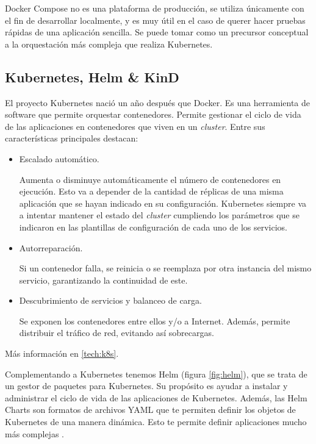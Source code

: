 Docker Compose no es una plataforma de producción, se utiliza únicamente con el fin de desarrollar localmente, y es muy útil en el caso de querer hacer pruebas rápidas de una aplicación sencilla. Se puede tomar como un precursor conceptual a la orquestación más compleja que realiza Kubernetes.

\subsection*{Kubernetes, Helm \& KinD}
\label{subsec:k8shelm}

El proyecto Kubernetes nació un año después que Docker. Es una herramienta de software que permite orquestar contenedores. Permite gestionar el ciclo de vida de las aplicaciones en contenedores que viven en un \textit{cluster}. Entre sus características principales destacan:

\begin{itemize}
  \item Escalado automático.

    Aumenta o disminuye automáticamente el número de contenedores en ejecución. Esto va a depender de la cantidad de réplicas de una misma aplicación que se hayan indicado en su configuración. Kubernetes siempre va a intentar mantener el estado del \textit{cluster} cumpliendo los parámetros que se indicaron en las plantillas de configuración de cada uno de los servicios.

  \item Autorreparación.

    Si un contenedor falla, se reinicia o se reemplaza por otra instancia del mismo servicio, garantizando la continuidad de este.

  \item Descubrimiento de servicios y balanceo de carga.

    Se exponen los contenedores entre ellos y/o a Internet. Además, permite distribuir el tráfico de red, evitando así sobrecargas.
\end{itemize}

Más información en \ref{tech:k8s}.

Complementando a Kubernetes tenemos Helm (figura \ref{fig:helm}), que se trata de un gestor de paquetes para Kubernetes. Su propósito es ayudar a instalar y administrar el ciclo de vida de las aplicaciones de Kubernetes. Además, las Helm Charts son formatos de archivos YAML que te permiten definir los objetos de Kubernetes de una manera dinámica. Esto te permite definir aplicaciones mucho más complejas .

